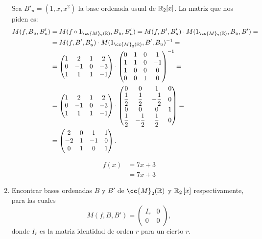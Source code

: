 \documentclass[12pt]{article}
\begin{document}
\begin{ejercicio}[2.5 puntos]
\begin{enumerate}
			Sea $B'_u = (1, x, x^2)$ la base ordenada usual de ${\mathbb{R}}_2[x]$. La matriz que nos piden es:
			\begin{align*}
				M(f, B_u, B'_u) &= M(f \circ 1_{\cc{M}_2(\R)}, B_u, B'_u) = M(f, B', B'_u) \cdot M(1_{\cc{M}_2(\R)}, B_u, B')
				=\\&= M(f, B', B'_u) \cdot M(1_{\cc{M}_2(\R)}, B', B_u)^{-1}
				=\\&= \begin{pmatrix}
					1 & 2 & 1 & 2 \\
					0 & -1 & 0 & -3 \\
					1 & 1 & 1 & -1
				\end{pmatrix} \cdot 
				\begin{pmatrix}
					0 & 1 & 0 & 1 \\
					1 & 1 & 0 & -1 \\
					1 & 0 & 0 & 0 \\
					0 & 0 & 1 & 0 
				\end{pmatrix}^{-1} 
				=\\&= \begin{pmatrix}
					1 & 2 & 1 & 2 \\
					0 & -1 & 0 & -3 \\
					1 & 1 & 1 & -1
				\end{pmatrix} \cdot 
				\begin{pmatrix}
					0 & 0 & 1 & 0 \\
					\dfrac{1}{2} & \dfrac{1}{2} & -\dfrac{1}{2} & 0 \\
					0 & 0 & 0 & 1 \\
					\dfrac{1}{2} & -\dfrac{1}{2} & \dfrac{1}{2} & 0 
				\end{pmatrix}
				=\\&=\begin{pmatrix}
						2 & 0 & 1 & 1 \\
						-2 & 1 & -1 & 0 \\
						0 & 1 & 0 & 1
					\end{pmatrix}.
			\end{align*}


			\begin{align*}
				f(x) &= 7x+3\\
					&= 7x+3
			\end{align*}
		
			
			
			\item Encontrar bases ordenadas $B$ y $B'$ de $\cc{M}_2(\R)$ y ${\mathbb{R}}_2\left[x\right]$ respectivamente, para las cuales
			\[
			M(f, B, B') = 
			\left(
			\begin{array}{c|c}
				I_r & 0 \\
				\hline
				0 & 0
			\end{array}
			\right)
			,
			\]
			donde $I_r$ es la matriz identidad de orden $r$ para un cierto $r$.
			

\end{enumerate}
\end{ejercicio}
\end{document}

